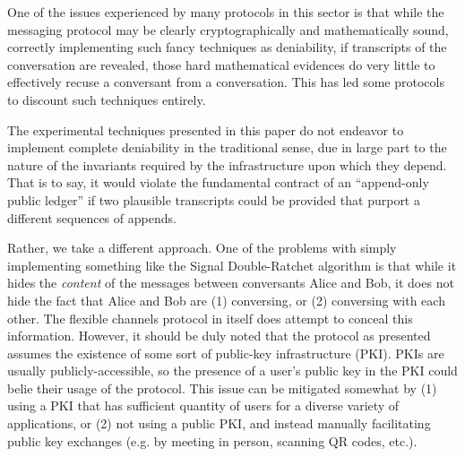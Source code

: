 One of the issues experienced by many protocols in this sector is that while the messaging protocol may be clearly cryptographically and mathematically sound, correctly implementing such fancy techniques as deniability, if transcripts of the conversation are revealed, those hard mathematical evidences do very little to effectively recuse a conversant from a conversation. This has led some protocols to discount such techniques entirely. \parencite{jefferys_session_2020}

The experimental techniques presented in this paper do not endeavor to implement complete deniability in the traditional sense, due in large part to the nature of the invariants required by the infrastructure upon which they depend. That is to say, it would violate the fundamental contract of an ``append-only public ledger'' if two plausible transcripts could be provided that purport a different sequences of appends.

Rather, we take a different approach. One of the problems with simply implementing something like the Signal Double-Ratchet algorithm is that while it hides the \emph{content} of the messages between conversants Alice and Bob, it does not hide the fact that Alice and Bob are (1) conversing, or (2) conversing with each other. The flexible channels protocol in itself does attempt to conceal this information. However, it should be duly noted that the protocol as presented assumes the existence of some sort of public-key infrastructure (PKI). PKIs are usually publicly-accessible, so the presence of a user's public key in the PKI could belie their usage of the protocol. This issue can be mitigated somewhat by (1) using a PKI that has sufficient quantity of users for a diverse variety of applications, or (2) not using a public PKI, and instead manually facilitating public key exchanges (e.g. by meeting in person, scanning QR codes, etc.).
